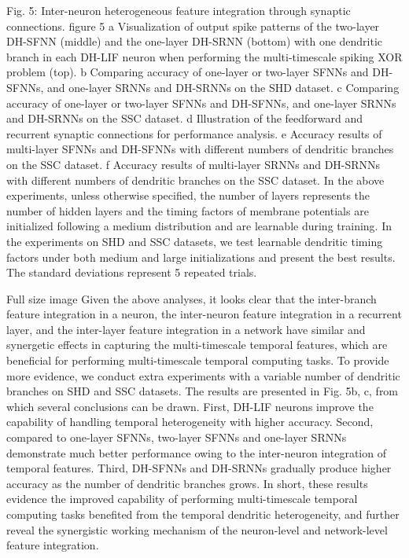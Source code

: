 Fig. 5: Inter-neuron heterogeneous feature integration through synaptic connections.
figure 5
a Visualization of output spike patterns of the two-layer DH-SFNN (middle) and the one-layer DH-SRNN (bottom) with one dendritic branch in each DH-LIF neuron when performing the multi-timescale spiking XOR problem (top). b Comparing accuracy of one-layer or two-layer SFNNs and DH-SFNNs, and one-layer SRNNs and DH-SRNNs on the SHD dataset. c Comparing accuracy of one-layer or two-layer SFNNs and DH-SFNNs, and one-layer SRNNs and DH-SRNNs on the SSC dataset. d Illustration of the feedforward and recurrent synaptic connections for performance analysis. e Accuracy results of multi-layer SFNNs and DH-SFNNs with different numbers of dendritic branches on the SSC dataset. f Accuracy results of multi-layer SRNNs and DH-SRNNs with different numbers of dendritic branches on the SSC dataset. In the above experiments, unless otherwise specified, the number of layers represents the number of hidden layers and the timing factors of membrane potentials are initialized following a medium distribution and are learnable during training. In the experiments on SHD and SSC datasets, we test learnable dendritic timing factors under both medium and large initializations and present the best results. The standard deviations represent 5 repeated trials.

Full size image
Given the above analyses, it looks clear that the inter-branch feature integration in a neuron, the inter-neuron feature integration in a recurrent layer, and the inter-layer feature integration in a network have similar and synergetic effects in capturing the multi-timescale temporal features, which are beneficial for performing multi-timescale temporal computing tasks. To provide more evidence, we conduct extra experiments with a variable number of dendritic branches on SHD and SSC datasets. The results are presented in Fig. 5b, c, from which several conclusions can be drawn. First, DH-LIF neurons improve the capability of handling temporal heterogeneity with higher accuracy. Second, compared to one-layer SFNNs, two-layer SFNNs and one-layer SRNNs demonstrate much better performance owing to the inter-neuron integration of temporal features. Third, DH-SFNNs and DH-SRNNs gradually produce higher accuracy as the number of dendritic branches grows. In short, these results evidence the improved capability of performing multi-timescale temporal computing tasks benefited from the temporal dendritic heterogeneity, and further reveal the synergistic working mechanism of the neuron-level and network-level feature integration.

